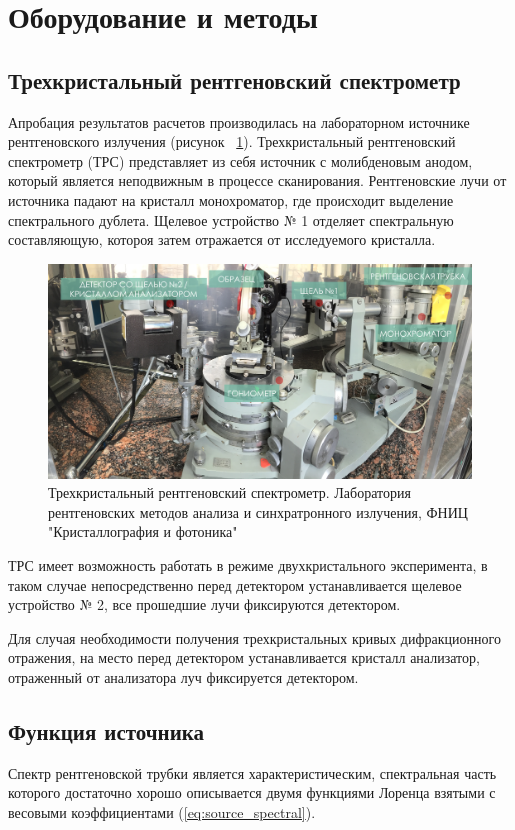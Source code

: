 \section{Оборудование и методы}
\subsection{Трехкристальный рентгеновский спектрометр}
Апробация результатов расчетов производилась на лабораторном источнике
рентгеновского излучения (рисунок ~\ref{ris:trs}). Трехкристальный рентгеновский
спектрометр (ТРС) представляет из себя источник с молибденовым анодом, который является
неподвижным в процессе сканирования. Рентгеновские лучи от источника падают на
 кристалл монохроматор, где происходит выделение спектрального дублета. Щелевое
 устройство № 1 отделяет спектральную составляющую, котороя затем отражается от
 исследуемого кристалла.

\begin{figure}[H]
  \centering
  \includegraphics[width=1\textwidth]{images/trs.png}
  \caption{ Трехкристальный рентгеновский спектрометр. Лаборатория рентгеновских
  методов анализа и синхратронного излучения, ФНИЦ "Кристаллография и фотоника"}
  \label{ris:trs}
\end{figure}

ТРС имеет возможность работать в режиме двухкристального эксперимента,
в таком случае непосредственно перед детектором устанавливается щелевое устройство
№ 2, все прошедшие лучи фиксируются детектором.

Для случая необходимости получения трехкристальных кривых дифракционного отражения,
на место перед детектором устанавливается кристалл анализатор, отраженный от анализатора луч
фиксируется детектором.

\subsection{Функция источника}
Спектр рентгеновской трубки является характеристическим, спектральная часть
 которого достаточно хорошо описывается двумя функциями Лоренца взятыми с
 весовыми коэффициентами (\ref{eq:source_spectral}).

